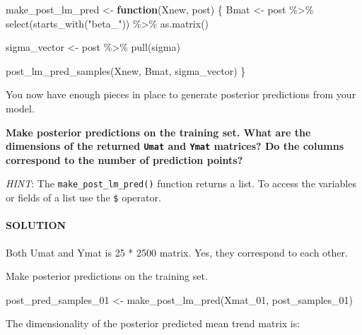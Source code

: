 \documentclass[
]{article}
\newenvironment{Shaded}{\begin{snugshade}}{\end{snugshade}}
\newcommand{\ControlFlowTok}[1]{\textcolor[rgb]{0.13,0.29,0.53}{\textbf{#1}}}
\newcommand{\DocumentationTok}[1]{\textcolor[rgb]{0.56,0.35,0.01}{\textbf{\textit{#1}}}}
\newcommand{\FunctionTok}[1]{\textcolor[rgb]{0.00,0.00,0.00}{#1}}
\newcommand{\NormalTok}[1]{#1}
\newcommand{\OtherTok}[1]{\textcolor[rgb]{0.56,0.35,0.01}{#1}}
\newcommand{\SpecialCharTok}[1]{\textcolor[rgb]{0.00,0.00,0.00}{#1}}
\newcommand{\StringTok}[1]{\textcolor[rgb]{0.31,0.60,0.02}{#1}}
\begin{document}
\begin{Shaded}
\begin{Highlighting}[]
\NormalTok{make\_post\_lm\_pred }\OtherTok{\textless{}{-}} \ControlFlowTok{function}\NormalTok{(Xnew, post)}
\NormalTok{\{}
\NormalTok{  Bmat }\OtherTok{\textless{}{-}}\NormalTok{ post }\SpecialCharTok{\%\textgreater{}\%} \FunctionTok{select}\NormalTok{(}\FunctionTok{starts\_with}\NormalTok{(}\StringTok{"beta\_"}\NormalTok{)) }\SpecialCharTok{\%\textgreater{}\%} \FunctionTok{as.matrix}\NormalTok{()}
  
\NormalTok{  sigma\_vector }\OtherTok{\textless{}{-}}\NormalTok{ post }\SpecialCharTok{\%\textgreater{}\%} \FunctionTok{pull}\NormalTok{(sigma)}
  
  \FunctionTok{post\_lm\_pred\_samples}\NormalTok{(Xnew, Bmat, sigma\_vector)}
\NormalTok{\}}
\end{Highlighting}
\end{Shaded}

You now have enough pieces in place to generate posterior predictions
from your model.

\textbf{Make posterior predictions on the training set. What are the
dimensions of the returned \texttt{Umat} and \texttt{Ymat} matrices? Do
the columns correspond to the number of prediction points?}

\emph{HINT}: The \texttt{make\_post\_lm\_pred()} function returns a
list. To access the variables or fields of a list use the \texttt{\$}
operator.

\hypertarget{solution-6}{%
\paragraph{SOLUTION}\label{solution-6}}

Both Umat and Ymat is 25 * 2500 matrix. Yes, they correspond to each
other.

Make posterior predictions on the training set.

\begin{Shaded}
\begin{Highlighting}[]
\NormalTok{post\_pred\_samples\_01 }\OtherTok{\textless{}{-}} \FunctionTok{make\_post\_lm\_pred}\NormalTok{(Xmat\_01, post\_samples\_01)}
\end{Highlighting}
\end{Shaded}

The dimensionality of the posterior predicted mean trend matrix is:

\begin{Shaded}
\end{Shaded}
\end{document}
